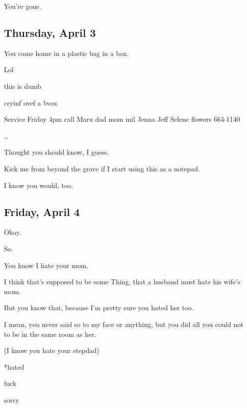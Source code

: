 { You're gone.

\newpage

\subsection*{Thursday, April 3}\label{thursday-april-3}

 You came home in a plastic bag in a box.

 Lol

 this is dumb

 cryinf ovef a bvox

 Service Friday 4pm call Maru dad mom mil Jenna Jeff Selene flowers 664-1140

\ldots{}

 Thought you should know, I guess.

 Kick me from beyond the grave if I start using this as a notepad.

 I know you would, too.

\newpage

\subsection*{Friday, April 4}\label{friday-april-4}

 Okay.

 So.

 You know I hate your mom.

 I think that's supposed to be some Thing, that a husband must hate his wife's mom.

 But you know that, because I'm pretty sure you hated her too.

 I mean, you never said so to my face or anything, but you did all you could not to be in the same room as her.

(I know you hate your stepdad)

*hated

 fuck

 sorry

}
